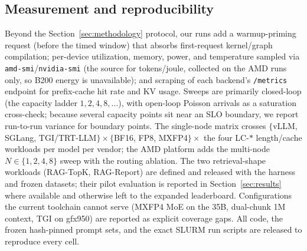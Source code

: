 \subsection{Measurement and reproducibility}
Beyond the Section~\ref{sec:methodology} protocol, our runs add a warmup-priming
request (before the timed window) that absorbs first-request kernel/graph
compilation; per-device utilization, memory, power, and temperature sampled via
\texttt{amd-smi}/\texttt{nvidia-smi} (the source for tokens/joule, collected on the
AMD runs only, so B200 energy is unavailable); and scraping of each backend's
\texttt{/metrics} endpoint for prefix-cache hit rate and KV usage. Sweeps are
primarily closed-loop (the capacity ladder $1,2,4,8,\dots$), with open-loop Poisson
arrivals as a saturation cross-check; because several capacity points sit near an
SLO boundary, we report run-to-run variance for boundary points. The single-node
matrix crosses $\{$vLLM, SGLang, TGI/TRT-LLM$\}\times\{$BF16, FP8, MXFP4$\}\times$
the four LC-$*$ length/cache workloads per model per vendor; the AMD platform adds
the multi-node $N\in\{1,2,4,8\}$ sweep with the routing ablation. The two
retrieval-shape workloads (RAG-TopK, RAG-Report) are defined and released with the
harness and frozen datasets; their pilot evaluation is reported in
Section~\ref{sec:results} where available and otherwise left to the expanded
leaderboard. Configurations the current
toolchain cannot serve (MXFP4 MoE on the 35B, dual-chunk 1M context, TGI on gfx950)
are reported as explicit coverage gaps. All code, the frozen hash-pinned prompt
sets, and the exact SLURM run scripts are released to reproduce every cell.
